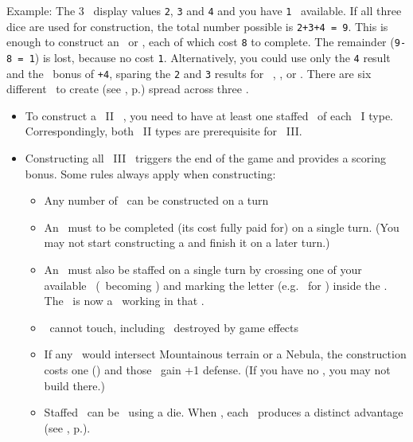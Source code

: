Example: The 3 \whitedice\ display values \texttt{2}, \texttt{3} and \texttt{4} and you have \texttt{1} \greatperson\ available.  
If all three dice are used for construction, the total number possible is \texttt{2+3+4 = 9}.  
This is enough to construct an \academy\ or \factory, each of which cost \texttt{8} to complete.  
The remainder (\texttt{9-8 = 1}) is lost, because no \armaments cost \texttt{1}. 
Alternatively, you could use only the \texttt{4} result and the \greatperson\ bonus of \texttt{+4}, sparing the \texttt{2} and \texttt{3} results for \activating\ \armaments, \trade, or \culture.
\newline\newline
There are six different \armaments\ to create (see , p.\pageref{sec:armaments}) spread across three \levels.
\begin{itemize}
	\item To construct a \level\ II \armament\ , you need to have at least one staffed \armament\ of each \level\ I type.  Correspondingly, both \level\ II types are prerequisite for \level\ III.
	\item Constructing all \level\ III \armaments\ triggers the end of the game and provides a scoring bonus.  Some rules always apply when constructing:
  \begin{itemize}
    \item Any number of \armaments\ can be constructed on a turn
    \item An \armament\ must to be completed (its cost fully paid for) on a single turn. (You may not start constructing a \armament and finish it on a later turn.)
    \item An \armament\ must also be staffed on a single turn by crossing one of your available \astronauts\ (\gainastronautsymbol\ becoming \useastronautsymbol) and marking the letter (e.g. \academysymbol\ for \academy) inside the \armament. The \astronaut\ is now a \specialist\ working in that \armament.
    \item \armaments\ cannot touch, including \armaments\ destroyed by game effects
    \item If any \armaments\ would intersect Mountainous terrain or a Nebula, the construction costs one (\spendcurrency) \currency and those \armaments\ gain +1 defense. (If you have no \currency, you may not build there.)  
		\item Staffed \armaments\ can be \activated\ using a die.  When \activated, each \armament\ produces a distinct advantage (see , p.\pageref{sec:armaments}).

\end{itemize}
\end{itemize}
